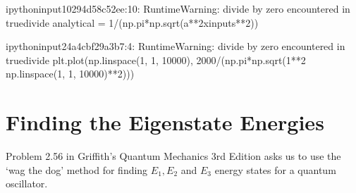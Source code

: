 \documentclass[letterpaper,10pt,english]{jupyterBook}
\begin{document}
\begin{sphinxVerbatim}[commandchars=\\\{\}]
\PYGZlt{}ipython\PYGZhy{}input\PYGZhy{}1\PYGZhy{}0294d58c52ee\PYGZgt{}:10: RuntimeWarning: divide by zero encountered in true\PYGZus{}divide
  analytical = 1/(np.pi*np.sqrt(a**2\PYGZhy{}x\PYGZus{}inputs**2))
\end{sphinxVerbatim}

\begin{sphinxVerbatim}[commandchars=\\\{\}]
    
  
       
 
\end{sphinxVerbatim}

\begin{sphinxVerbatim}[commandchars=\\\{\}]
\PYGZlt{}ipython\PYGZhy{}input\PYGZhy{}2\PYGZhy{}4a4cbf29a3b7\PYGZgt{}:4: RuntimeWarning: divide by zero encountered in true\PYGZus{}divide
  plt.plot(np.linspace(\PYGZhy{}1, 1, 10000), 2000/(np.pi*np.sqrt(1**2 \PYGZhy{} np.linspace(\PYGZhy{}1, 1, 10000)**2)))
\end{sphinxVerbatim}

\noindent{}


\chapter{Finding the Eigenstate Energies}
\label{\detokenize{2.56:finding-the-eigenstate-energies}}\label{\detokenize{2.56::doc}}
\sphinxAtStartPar
Problem 2.56 in Griffith’s Quantum Mechanics 3rd Edition asks us to use the ‘wag the dog’ method for finding \(E_1, E_2\) and \(E_3\) energy states for a quantum oscillator.
\end{document}
